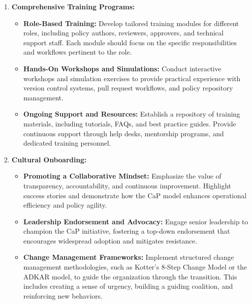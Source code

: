 \documentclass[11pt]{article}
\begin{document}
\begin{enumerate}
    \item \textbf{Comprehensive Training Programs:}
    \begin{itemize}
        \item \textbf{Role-Based Training:} Develop tailored training modules for different roles, including policy authors, reviewers, approvers, and technical support staff. Each module should focus on the specific responsibilities and workflows pertinent to the role.
        \item \textbf{Hands-On Workshops and Simulations:} Conduct interactive workshops and simulation exercises to provide practical experience with version control systems, pull request workflows, and policy repository management.
        \item \textbf{Ongoing Support and Resources:} Establish a repository of training materials, including tutorials, FAQs, and best practice guides. Provide continuous support through help desks, mentorship programs, and dedicated training personnel.
    \end{itemize}

    \item \textbf{Cultural Onboarding:}
    \begin{itemize}
        \item \textbf{Promoting a Collaborative Mindset:} Emphasize the value of transparency, accountability, and continuous improvement. Highlight success stories and demonstrate how the CaP model enhances operational efficiency and policy agility.
        \item \textbf{Leadership Endorsement and Advocacy:} Engage senior leadership to champion the CaP initiative, fostering a top-down endorsement that encourages widespread adoption and mitigates resistance.
        \item \textbf{Change Management Frameworks:} Implement structured change management methodologies, such as Kotter's 8-Step Change Model or the ADKAR model, to guide the organization through the transition. This includes creating a sense of urgency, building a guiding coalition, and reinforcing new behaviors.
    \end{itemize}


\end{enumerate}
\end{document}

